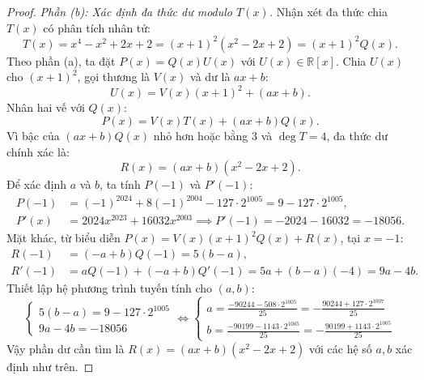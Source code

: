 \documentclass{article}
\begin{document}
\begin{proof}
\emph{Phần (b): Xác định đa thức dư modulo $T(x)$.}
Nhận xét đa thức chia $T(x)$ có phân tích nhân tử:
\begin{equation}
    T(x) = x^4 - x^2 + 2x + 2 = (x + 1)^2(x^2 - 2x + 2) = (x + 1)^2 Q(x).
\end{equation}
Theo phần (a), ta đặt $P(x) = Q(x) U(x)$ với $U(x) \in \mathbb{R}[x]$.
Chia $U(x)$ cho $(x + 1)^2$, gọi thương là $V(x)$ và dư là $ax + b$:
\begin{equation}
    U(x) = V(x)(x + 1)^2 + (ax + b).
\end{equation}
Nhân hai vế với $Q(x)$:
\begin{equation}
    P(x) = V(x) T(x) + (ax + b)Q(x).
\end{equation}
Vì bậc của $(ax + b)Q(x)$ nhỏ hơn hoặc bằng 3 và $\deg T = 4$, đa thức dư chính xác là:
\begin{equation}
    R(x) = (ax + b)(x^2 - 2x + 2).
\end{equation}
Để xác định $a$ và $b$, ta tính $P(-1)$ và $P'(-1)$:
\begin{align}
    P(-1) &= (-1)^{2024} + 8(-1)^{2004} - 127 \cdot 2^{1005} = 9 - 127 \cdot 2^{1005}, \\
    P'(x) &= 2024 x^{2023} + 16032 x^{2003} \implies P'(-1) = -2024 - 16032 = -18056.
\end{align}
Mặt khác, từ biểu diễn $P(x) = V(x)(x+1)^2 Q(x) + R(x)$, tại $x = -1$:
\begin{align}
    R(-1) &= (-a + b)Q(-1) = 5(b - a), \\
    R'(-1) &= a Q(-1) + (-a + b)Q'(-1) = 5a + (b - a)(-4) = 9a - 4b.
\end{align}
Thiết lập hệ phương trình tuyến tính cho $(a, b)$:
\begin{equation}
    \begin{cases}
        5(b - a) = 9 - 127 \cdot 2^{1005} \\
        9a - 4b = -18056
    \end{cases}
    \iff
    \begin{cases}
        a = \frac{-90244 - 508 \cdot 2^{1005}}{25} = -\frac{90244 + 127 \cdot 2^{1007}}{25} \\
        b = \frac{-90199 - 1143 \cdot 2^{1005}}{25} = -\frac{90199 + 1143 \cdot 2^{1005}}{25}
    \end{cases}
\end{equation}
Vậy phần dư cần tìm là $R(x) = (ax + b)(x^2 - 2x + 2)$ với các hệ số $a, b$ xác định như trên.
\end{proof}
\end{document}

